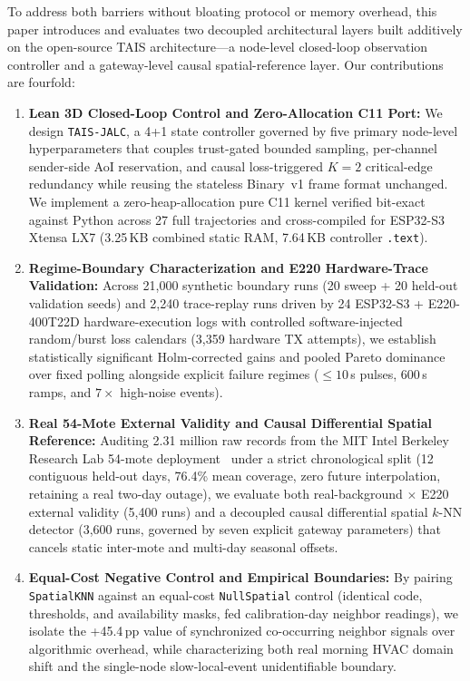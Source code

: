 \documentclass[journal,twoside,web]{ieeecolor}
\begin{document}
To address both barriers without bloating protocol or memory overhead, this paper introduces and evaluates two decoupled architectural layers built additively on the open-source TAIS architecture---a node-level closed-loop observation controller and a gateway-level causal spatial-reference layer. Our contributions are fourfold:
\begin{enumerate}
\item \textbf{Lean 3D Closed-Loop Control and Zero-Allocation C11 Port:} We design \texttt{TAIS-JALC}, a 4+1 state controller governed by five primary node-level hyperparameters that couples trust-gated bounded sampling, per-channel sender-side AoI reservation, and causal loss-triggered $K{=}2$ critical-edge redundancy while reusing the stateless Binary~v1 frame format unchanged. We implement a zero-heap-allocation pure C11 kernel verified bit-exact against Python across 27 full trajectories and cross-compiled for ESP32-S3 Xtensa LX7 (3.25\,KB combined static RAM, 7.64\,KB controller \texttt{.text}).
\item \textbf{Regime-Boundary Characterization and E220 Hardware-Trace Validation:} Across 21,000 synthetic boundary runs (20 sweep + 20 held-out validation seeds) and 2,240 trace-replay runs driven by 24 ESP32-S3 + E220-400T22D hardware-execution logs with controlled software-injected random/burst loss calendars (3,359 hardware TX attempts), we establish statistically significant Holm-corrected gains and pooled Pareto dominance over fixed polling alongside explicit failure regimes ($\le 10$\,s pulses, 600\,s ramps, and $7\times$ high-noise events).
\item \textbf{Real 54-Mote External Validity and Causal Differential Spatial Reference:} Auditing 2.31 million raw records from the MIT Intel Berkeley Research Lab 54-mote deployment~\cite{madden2004intel} under a strict chronological split (12 contiguous held-out days, 76.4\% mean coverage, zero future interpolation, retaining a real two-day outage), we evaluate both real-background $\times$ E220 external validity (5,400 runs) and a decoupled causal differential spatial $k$-NN detector (3,600 runs, governed by seven explicit gateway parameters) that cancels static inter-mote and multi-day seasonal offsets.
\item \textbf{Equal-Cost Negative Control and Empirical Boundaries:} By pairing \texttt{SpatialKNN} against an equal-cost \texttt{NullSpatial} control (identical code, thresholds, and availability masks, fed calibration-day neighbor readings), we isolate the +45.4\,pp value of synchronized co-occurring neighbor signals over algorithmic overhead, while characterizing both real morning HVAC domain shift and the single-node slow-local-event unidentifiable boundary.
\end{enumerate}
\end{document}
